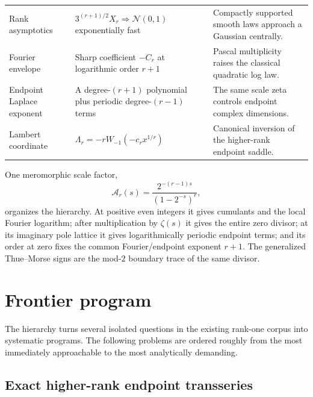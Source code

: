 \documentclass[11pt,oneside]{article}
\theoremstyle{definition}
\theoremstyle{remark}
\begin{document}
\begin{longtable}{@{}>{\raggedright\arraybackslash}p{}>{\raggedright\arraybackslash}p{}>{\raggedright\arraybackslash}p{}@{}}
Rank asymptotics
& $3^{(r+1)/2}X_r\Rightarrow\mathcal N(0,1)$ exponentially fast
& Compactly supported smooth laws approach a Gaussian centrally.\\

Fourier envelope
& Sharp coefficient $-C_r$ at logarithmic order $r+1$
& Pascal multiplicity raises the classical quadratic log law.\\

Endpoint Laplace exponent
& A degree-$(r+1)$ polynomial plus periodic degree-$(r-1)$ terms
& The same scale zeta controls endpoint complex dimensions.\\

Lambert coordinate
& $\Lambda_r=-rW_{-1}(-c_rx^{1/r})$
& Canonical inversion of the higher-rank endpoint saddle.\\
\bottomrule
\end{longtable}

\begin{resultbox}
One meromorphic scale factor,
\[
 \mathcal A_r(s)=\frac{2^{-(r-1)s}}{(1-2^{-s})^r},
\]
organizes the hierarchy.  At positive even integers it gives cumulants and the local Fourier logarithm; after multiplication by $\zeta(s)$ it gives the entire zero divisor; at its imaginary pole lattice it gives logarithmically periodic endpoint terms; and its order at zero fixes the common Fourier/endpoint exponent $r+1$.  The generalized Thue--Morse signs are the mod-$2$ boundary trace of the same divisor.
\end{resultbox}

\section{Frontier program}\label{p3:sec:frontier-program}

The hierarchy turns several isolated questions in the existing rank-one corpus into systematic programs.  The following problems are ordered roughly from the most immediately approachable to the most analytically demanding.

\subsection{Exact higher-rank endpoint transseries}
\end{document}
